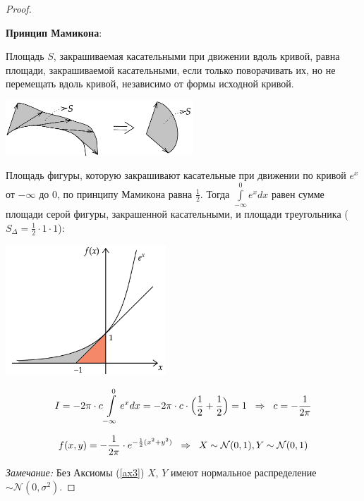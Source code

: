 \documentclass[12pt]{article} %
\theoremstyle{definition} %
\begin{document}
\begin{proof}
\begin{itemize}[label={$\bullet$}]
            \textbf{Принцип Мамикона}: \par
            Площадь $S$, закрашиваемая касательными при движении вдоль кривой, равна площади, закрашиваемой касательными, если только поворачивать их, но не перемещать вдоль кривой, независимо от формы исходной кривой.\par
            \begin{center}
               \includegraphics[width=7cm]{images/pic05_06.png}
            \end{center}
            \addlinespace
            Площадь фигуры, которую закрашивают касательные при движении по кривой $e^x$ от $-\infty \text{ до } 0$, по принципу Мамикона равна $\frac{1}{2}$. Тогда $\int\limits_{-\infty}^{0}e^{x}dx$ равен сумме площади серой фигуры, закрашенной касательными, и площади треугольника ($S_{\Delta}=\frac{1}{2}\cdot 1 \cdot 1$):
            \begin{center}
               \includegraphics[width=6cm]{images/pic06_06.png}
            \end{center} 
            \[
            I = -2\pi \cdot c \int\limits_{-\infty}^{0}e^{x}dx = -2\pi \cdot c \cdot \Big(\frac{1}{2} + \frac{1}{2}\Big) = 1 \hspace{0.2cm} \Rightarrow \hspace{0.2cm} c = -\frac{1}{2\pi} \] \par
            \[
             f(x,y) = -\frac{1}{2\pi} \cdot e^{-\frac{1}{2}(x^2+y^2)} \hspace{0.2cm} \Rightarrow \hspace{0.2cm} X \sim \mathcal{N}(0, 1), Y \sim \mathcal{N}(0, 1) 
            \] 
    \end{itemize}
    
    \emph{Замечание:} Без Аксиомы (\ref{ax3}) $X$, $Y$ имеют нормальное распределение $\sim \mathcal{N}(0, \sigma^2)$.
\end{proof}
\end{document}
